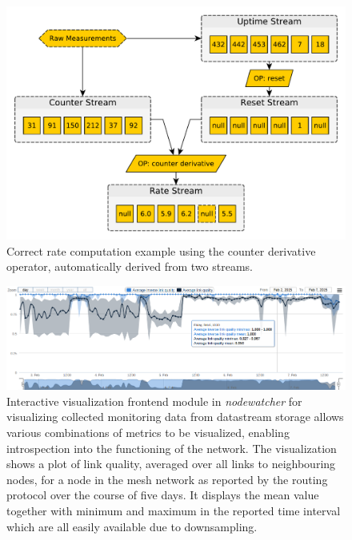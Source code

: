 \documentclass[5p,sort&compress]{elsarticle}
\newcommand{\nodewatcher}{\textit{nodewatcher}}
\begin{document}
\begin{figure}
  \centering
  \includegraphics[scale=0.4]{figures/datastream-counter-reset.pdf}
  \caption{Correct rate computation example using the counter derivative operator, automatically derived from two streams.}
  \label{fig:datastream-counter-reset}
\end{figure}

\begin{figure}
  \centering
  \includegraphics[scale=0.45]{figures/implementation-interactive-visualization.png}
  \caption{Interactive visualization frontend module in \nodewatcher{} for visualizing collected monitoring data from datastream storage allows various combinations of metrics to be visualized, enabling introspection into the functioning of the network.
  The visualization shows a plot of link quality, averaged over all links to neighbouring nodes, for a node in the mesh network as reported by the routing protocol over the course of five days.
  It displays the mean value together with minimum and maximum in the reported time interval which are all easily available due to downsampling.}
  \label{fig:interactive-visualization}
\end{figure}
\end{document}
